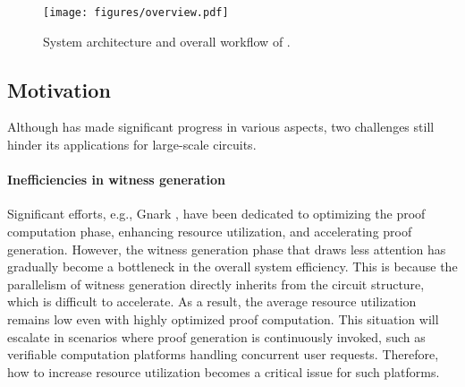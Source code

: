 \begin{figure*}[t]
\centering
\texttt{[image: figures/overview.pdf]}
\caption{System architecture and overall workflow of \system.}
\label{fig:overview}
\end{figure*}


\vspace{-10pt}

\subsection{Motivation}

Although \zk has made significant progress in various aspects, two challenges still hinder its applications for large-scale circuits. 




\paragraph{Inefficiencies in witness generation} 
Significant efforts, e.g., Gnark \cite{gnark}, have been dedicated to optimizing the proof computation phase, enhancing resource utilization, and accelerating proof generation. However, the witness generation phase that draws less attention has gradually become a bottleneck in the overall system efficiency. This is because the parallelism of witness generation directly inherits from the circuit structure, which is difficult to accelerate. As a result, the average resource utilization remains low even with highly optimized proof computation. This situation will escalate in scenarios where proof generation is continuously invoked, such as verifiable computation platforms handling concurrent user requests. Therefore, how to increase resource utilization becomes a critical issue for such platforms. 







